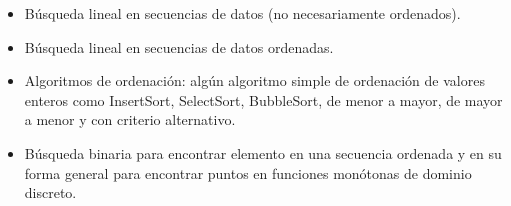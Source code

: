 \begin{itemize}
\item[\basic] Búsqueda lineal en secuencias de datos (no necesariamente ordenados).
\item[\basic] Búsqueda lineal en secuencias de datos ordenadas.
\item[\advanced]
  Algoritmos de ordenación: algún algoritmo simple de ordenación de valores
  enteros como InsertSort, SelectSort, BubbleSort, de menor a mayor, de mayor a
  menor y con criterio alternativo.
\item[\ultra] Búsqueda binaria para encontrar elemento en una secuencia ordenada
  y en su forma general para encontrar puntos en funciones monótonas
  de dominio discreto.
\end{itemize}


